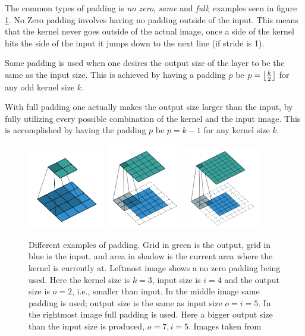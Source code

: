  The common types of padding is \textit{no zero}, \textit{same} and \textit{full}; examples seen in figure \ref{fig:padding}. No Zero padding involves having no padding outside of the input. This means that the kernel never goes outside of the actual image, once a side of the kernel hits the side of the input it jumps down to the next line (if stride is 1). 
 
 Same padding is used when one desires the output size of the layer to be the same as the input size. This is achieved by having a padding $p$ be $ p = \left\lfloor \frac{k}{2} \right\rfloor $ for any odd kernel size $k$.
  
 With full padding one actually makes the output size larger than the input, by fully utilizing every possible combination of the kernel and the input image. This is accomplished  by having the padding $p $ be $p = k - 1$ for any kernel size $k$. 
 
 
 \begin{figure}[hbtp]
\begin{center}
\includegraphics[width = 0.3\textwidth]{./Images/noPad.png}
\includegraphics[width = 0.3\textwidth]{./Images/samePad.png}
\includegraphics[width = 0.3\textwidth]{./Images/fullPad.png} 
\caption{Different examples of padding. Grid in green is the output, grid in blue is the input, and area in shadow is the current area where the kernel is currently at. Leftmost image shows a no zero padding being used. Here the kernel size is $k = 3$, input size is $i = 4$ and the output size is  $o = 2$, i.e., smaller than input.  In the middle image same padding is used; output size is the same as input size $o = i = 5$. In the rightmost image full padding is used. Here a bigger output size than the input size is produced, $o = 7, i = 5$. Images taken from \cite{convArit}}
\label{fig:padding}
\end{center}
\end{figure}
 
